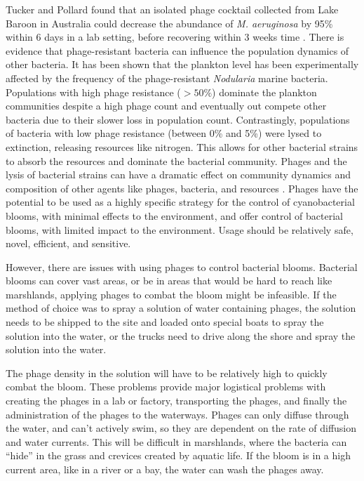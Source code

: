 Tucker and Pollard found that an isolated phage cocktail collected from Lake Baroon in Australia could decrease the abundance of \textit{M. aeruginosa} by 95\% within 6 days in a lab setting, before recovering within 3 weeks time \cite{tuckerIdentificationCyanophageMaLBP2005}. \newline
There is evidence that phage-resistant bacteria can influence the population dynamics of other bacteria.
It has been shown that the plankton level has been experimentally affected by the frequency of the phage-resistant \textit{Nodularia} marine bacteria.
Populations with high phage resistance ($>50\%$) dominate the plankton communities despite a high phage count and eventually out compete other bacteria due to their slower loss in population count.
Contrastingly, populations of bacteria with low phage resistance (between 0\% and 5\%) were lysed to extinction, releasing resources like nitrogen.
This allows for other bacterial strains to absorb the resources and dominate the bacterial community.
Phages and the lysis of bacterial strains can have a dramatic effect on community dynamics and composition of other agents like phages, bacteria, and resources \cite{colomaFrequencyVirusresistantHosts2019}.
Phages have the potential to be used as a highly specific strategy for the control of cyanobacterial blooms, with minimal effects to the environment, and offer control of bacterial blooms, with limited impact to the environment.
Usage should be relatively safe, novel, efficient, and sensitive. \newline 

However, there are issues with using phages to control bacterial blooms.
Bacterial blooms can cover vast areas, or be in areas that would be hard to reach like marshlands, applying phages to combat the bloom might be infeasible.
If the method of choice was to spray a solution of water containing phages, the solution needs to be shipped to the site and loaded onto special boats to spray the solution into the water, or the trucks need to drive along the shore and spray the solution into the water.

The phage density in the solution will have to be relatively high to quickly combat the bloom.
These problems provide major logistical problems with creating the phages in a lab or factory, transporting the phages, and finally the administration of the phages to the waterways.
Phages can only diffuse through the water, and can't actively swim, so they are dependent on the rate of diffusion and water currents.
This will be difficult in marshlands, where the bacteria can “hide” in the grass and crevices created by aquatic life.
If the bloom is in a high current area, like in a river or a bay, the water can wash the phages away.

